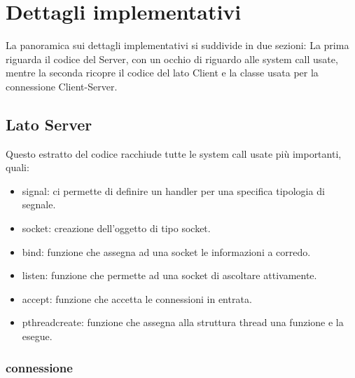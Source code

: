 \documentclass[a4paper,11pt]{report}
\begin{document}
\chapter{\Large{\textbf{Dettagli implementativi}}}
La panoramica sui dettagli implementativi si suddivide in due sezioni: La prima riguarda il codice del Server, con un occhio di riguardo alle system call usate, mentre la seconda ricopre il codice del lato Client e la classe usata per la connessione Client-Server.

\section{\Large{\textbf{Lato Server}}}
Questo estratto del codice racchiude tutte le system call usate più importanti, quali: 

\begin{itemize}
\item signal: ci permette di definire un handler per una specifica tipologia di segnale.
\item socket: creazione dell'oggetto di tipo socket.
\item bind: funzione che assegna ad una socket le informazioni a corredo.
\item listen: funzione che permette ad una socket di ascoltare attivamente.
\item accept: funzione che accetta le connessioni in entrata.
\item pthreadcreate: funzione che assegna alla struttura thread una funzione e la esegue.
\end{itemize}

\subsection{connessione}
\end{document}
